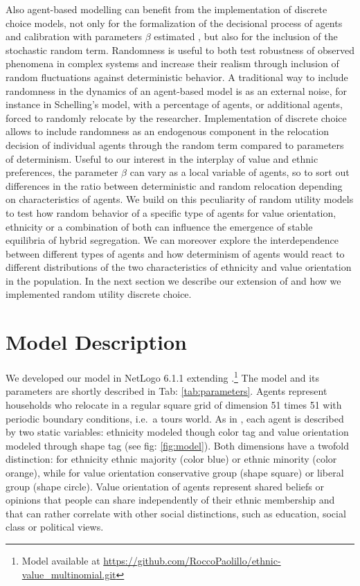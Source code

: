 \documentclass[
]{article}
\begin{document}
Also agent-based modelling can benefit from the implementation of
discrete choice models, not only for the formalization of the decisional
process of agents and calibration with parameters \(\beta\) estimated
\citep{bruch2006neighborhood}, but also for the inclusion of the
stochastic random term. Randomness is useful to both test robustness of
observed phenomena in complex systems and increase their realism through
inclusion of random fluctuations against deterministic behavior. A
traditional way to include randomness in the dynamics of an agent-based
model is as an external noise, for instance in Schelling's model, with a
percentage of agents, or additional agents, forced to randomly relocate
by the researcher. Implementation of discrete choice allows to include
randomness as an endogenous component in the relocation decision of
individual agents through the random term compared to parameters of
determinism. Useful to our interest in the interplay of value and ethnic
preferences, the parameter \(\beta\) can vary as a local variable of
agents, so to sort out differences in the ratio between deterministic
and random relocation depending on characteristics of agents. We build
on this peculiarity of random utility models to test how random behavior
of a specific type of agents for value orientation, ethnicity or a
combination of both can influence the emergence of stable equilibria of
hybrid segregation. We can moreover explore the interdependence between
different types of agents and how determinism of agents would react to
different distributions of the two characteristics of ethnicity and
value orientation in the population. In the next section we describe our
extension of \cite{paolillo2018} and how we implemented random utility
discrete choice.

\hypertarget{model-description}{%
\section{Model Description}\label{model-description}}

We developed our model in NetLogo 6.1.1 \citep{wilenskynl} extending
\cite{paolillo2018}.\footnote{Model available at \url{https://github.com/RoccoPaolillo/ethnic-value_multinomial.git}}
The model and its parameters are shortly described in Tab:
\ref{tab:parameters}. Agents represent households who relocate in a
regular square grid of dimension 51 times 51 with periodic boundary
conditions, i.e.~a tours world. As in \cite{paolillo2018}, each agent is
described by two static variables: ethnicity modeled though color tag
and value orientation modeled through shape tag (see fig:
\ref{fig:model}). Both dimensions have a twofold distinction: for
ethnicity ethnic majority (color blue) or ethnic minority (color
orange), while for value orientation conservative group (shape square)
or liberal group (shape circle). Value orientation of agents represent
shared beliefs or opinions that people can share independently of their
ethnic membership and that can rather correlate with other social
distinctions, such as education, social class or political views.
\end{document}
